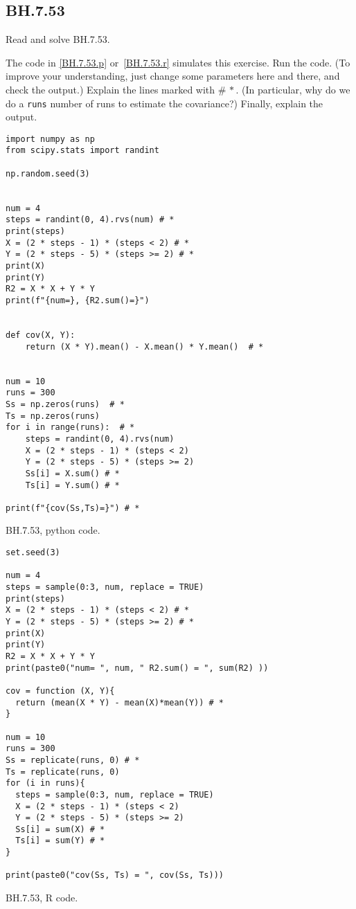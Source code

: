 

\subsection{BH.7.53}
\label{sec:bh.53}

\begin{exercise}
Read and solve BH.7.53.
\end{exercise}


\begin{exercise}
The code in \cref{BH.7.53.p} or~\cref{BH.7.53.r} simulates this exercise.
Run the code. (To improve your understanding, just change some parameters here and there, and check the output.) Explain the lines marked with $\# \, *$. (In particular, why do we do a \verb|runs| number of runs to estimate the covariance?) Finally, explain the output.
\end{exercise}

\begin{listing}[!ht]
\begin{verbatim}
import numpy as np
from scipy.stats import randint

np.random.seed(3)


num = 4
steps = randint(0, 4).rvs(num) # *
print(steps)
X = (2 * steps - 1) * (steps < 2) # *
Y = (2 * steps - 5) * (steps >= 2) # *
print(X)
print(Y)
R2 = X * X + Y * Y
print(f"{num=}, {R2.sum()=}")


def cov(X, Y):
    return (X * Y).mean() - X.mean() * Y.mean()  # *


num = 10
runs = 300
Ss = np.zeros(runs)  # *
Ts = np.zeros(runs)
for i in range(runs):  # *
    steps = randint(0, 4).rvs(num)
    X = (2 * steps - 1) * (steps < 2)
    Y = (2 * steps - 5) * (steps >= 2)
    Ss[i] = X.sum() # *
    Ts[i] = Y.sum() # *

print(f"{cov(Ss,Ts)=}") # *
\end{verbatim}
\caption{BH.7.53, python code.}
\label{BH.7.53.p}


\end{listing}

\begin{listing}[!ht]
\begin{verbatim}
set.seed(3)

num = 4
steps = sample(0:3, num, replace = TRUE)
print(steps)
X = (2 * steps - 1) * (steps < 2) # *
Y = (2 * steps - 5) * (steps >= 2) # *
print(X)
print(Y)
R2 = X * X + Y * Y
print(paste0("num= ", num, " R2.sum() = ", sum(R2) ))

cov = function (X, Y){
  return (mean(X * Y) - mean(X)*mean(Y)) # *
}

num = 10
runs = 300
Ss = replicate(runs, 0) # *
Ts = replicate(runs, 0)
for (i in runs){
  steps = sample(0:3, num, replace = TRUE)
  X = (2 * steps - 1) * (steps < 2)
  Y = (2 * steps - 5) * (steps >= 2)
  Ss[i] = sum(X) # *
  Ts[i] = sum(Y) # *
}

print(paste0("cov(Ss, Ts) = ", cov(Ss, Ts)))
\end{verbatim}
\caption{BH.7.53, R code.}
\label{BH.7.53.r}
\end{listing}

